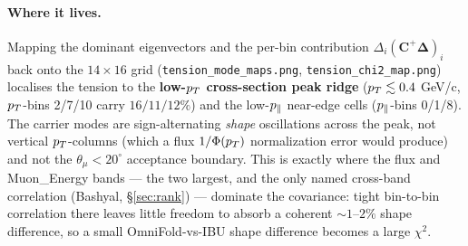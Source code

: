 \paragraph{Where it lives.}
Mapping the dominant eigenvectors and the per-bin contribution
$\Delta_{i}(\mathbf{C}^{+}\boldsymbol{\Delta})_{i}$ back onto the
$14\times16$ grid (\texttt{tension\_mode\_maps.png},
\texttt{tension\_chi2\_map.png}) localises the tension to the
\textbf{low-$p_{T}$ cross-section peak ridge} ($p_{T}\lesssim0.4$ GeV/c,
$p_{T}$-bins 2/7/10 carry $16/11/12\%$) and the low-$p_{\parallel}$ near-edge
cells ($p_{\parallel}$-bins 0/1/8). The carrier modes are sign-alternating
\emph{shape} oscillations across the peak, not vertical $p_{T}$-columns
(which a flux $1/\Phi(p_{T})$ normalization error would produce) and not
the $\theta_{\mu}<20^{\circ}$ acceptance boundary. This is exactly where
the flux and Muon\_Energy bands --- the two largest, and the only named
cross-band correlation (Bashyal, \S\ref{sec:rank}) --- dominate the
covariance: tight bin-to-bin correlation there leaves little freedom to
absorb a coherent $\sim1$--$2\%$ shape difference, so a small
OmniFold-vs-IBU shape difference becomes a large $\chi^{2}$.

